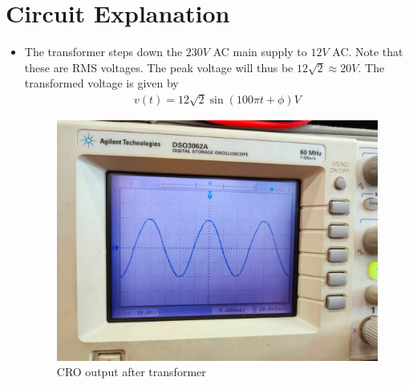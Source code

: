 \documentclass[journal,12pt,twocolumn]{IEEEtran}
\begin{document}
	\section{Circuit Explanation}
	\begin{itemize}
	\item The transformer steps down the $230 V$ AC main supply to $12 V$ AC. Note that these are RMS voltages. The peak voltage will thus be $12\sqrt{2} \approx 20V$. The transformed voltage is given by
	\begin{align}
		v(t) = 12\sqrt{2}\sin(100\pi t + \phi) V
	\end{align}
	\begin{figure}[!ht]
		\centering
		\includegraphics[width=\columnwidth]{./figs/transformer.jpeg}
		\caption{CRO output after transformer}
		\label{fig-transformer}	
	\end{figure}
	

\end{itemize}
\end{document}
